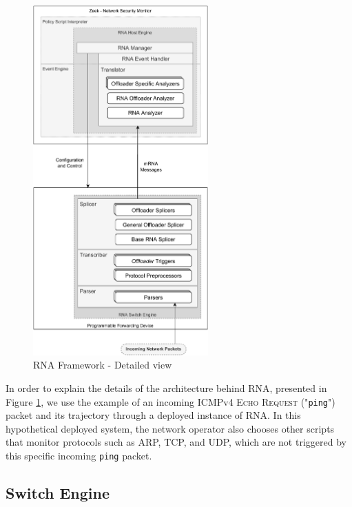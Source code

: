 \begin{figure}[ht!]
    \caption{RNA Framework - Detailed view}
    \begin{center}
        \includegraphics[width=0.6\textwidth]{images/arch_low_level.pdf}  
    \end{center}
    \label{fig:arch_low_level}
\end{figure}

In order to explain the details of the architecture behind RNA, presented in Figure \ref{fig:arch_low_level}, we use the example of an incoming ICMPv4 \textsc{Echo Request} ("\texttt{ping}") packet and its trajectory through a deployed instance of RNA. In this hypothetical deployed system, the network operator also chooses other scripts that monitor protocols such as ARP, TCP, and UDP, which are not triggered by this specific incoming \texttt{ping} packet.

\subsection{Switch Engine}

